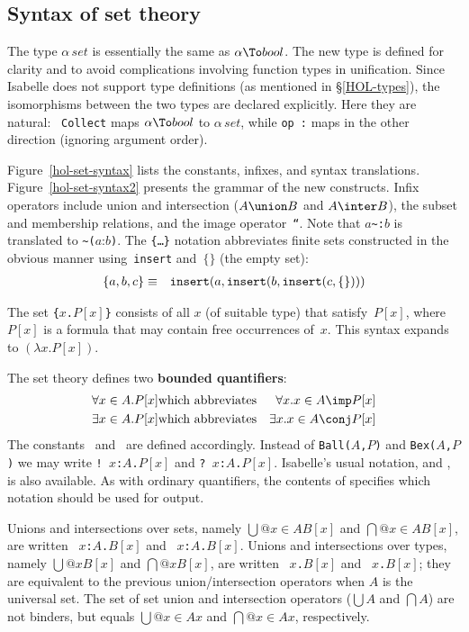 \subsection{Syntax of set theory}
The type $\alpha\,set$ is essentially the same as $\alpha\To bool$.  The
new type is defined for clarity and to avoid complications involving
function types in unification.  Since Isabelle does not support type
definitions (as mentioned in \S\ref{HOL-types}), the isomorphisms between
the two types are declared explicitly.  Here they are natural: {\tt
  Collect} maps $\alpha\To bool$ to $\alpha\,set$, while \hbox{\tt op :}
maps in the other direction (ignoring argument order).

Figure~\ref{hol-set-syntax} lists the constants, infixes, and syntax
translations.  Figure~\ref{hol-set-syntax2} presents the grammar of the new
constructs.  Infix operators include union and intersection ($A\union B$
and $A\inter B$), the subset and membership relations, and the image
operator~{\tt``}.  Note that $a$\verb|~:|$b$ is translated to
\verb|~(|$a$:$b$\verb|)|.  The {\tt\{\ldots\}} notation abbreviates finite
sets constructed in the obvious manner using~{\tt insert} and~$\{\}$ (the
empty set):
\begin{eqnarray*}
 \{a,b,c\} & \equiv & {\tt insert}(a,{\tt insert}(b,{\tt insert}(c,\{\})))
\end{eqnarray*}

The set \hbox{\tt\{$x$.$P[x]$\}} consists of all $x$ (of suitable type)
that satisfy~$P[x]$, where $P[x]$ is a formula that may contain free
occurrences of~$x$.  This syntax expands to $(\lambda
x.P[x])$. 

The set theory defines two {\bf bounded quantifiers}:
\begin{eqnarray*}
   \forall x\in A.P[x] &\hbox{which abbreviates}& \forall x. x\in A\imp P[x] \\
   \exists x\in A.P[x] &\hbox{which abbreviates}& \exists x. x\in A\conj P[x]
\end{eqnarray*}
The constants~ and~ are defined
accordingly.  Instead of {\tt Ball($A$,$P$)} and {\tt Bex($A$,$P$)} we may
write
\hbox{\tt !~$x$:$A$.$P[x]$} and \hbox{\tt ?~$x$:$A$.$P[x]$}. 
Isabelle's usual notation,  and , is also
available.  As with
ordinary quantifiers, the contents of  specifies
which notation should be used for output.

Unions and intersections over sets, namely $\bigcup@{x\in A}B[x]$ and
$\bigcap@{x\in A}B[x]$, are written 
~\hbox{\tt$x$:$A$.$B[x]$} and
~\hbox{\tt$x$:$A$.$B[x]$}.  
Unions and intersections over types, namely $\bigcup@x B[x]$ and
$\bigcap@x B[x]$, are written 
~\hbox{\tt$x$.$B[x]$} and
~\hbox{\tt$x$.$B[x]$}; they are equivalent to the previous
union/intersection operators when $A$ is the universal set.
The set of set union and intersection operators ($\bigcup A$ and $\bigcap
A$) are not binders, but equals $\bigcup@{x\in A}x$ and $\bigcap@{x\in
  A}x$, respectively.

